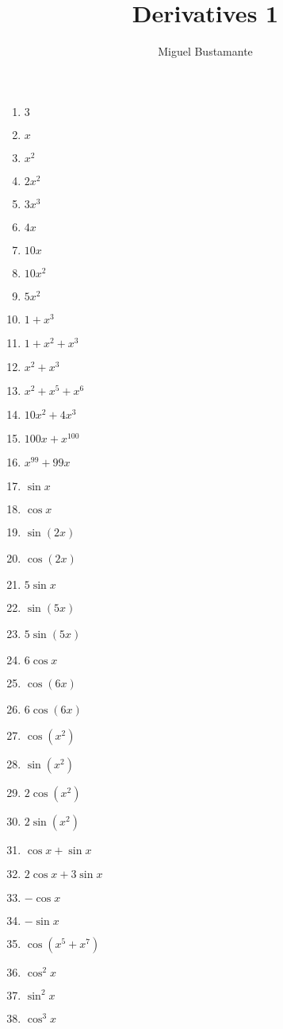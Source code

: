 \documentclass{article}
\title{Derivatives 1}
\author{Miguel Bustamante}
\begin{document}
\maketitle
\begin{multicols}{3} %
\begin{enumerate}
    \item $3$
    \item $x$
    \item $x^2$
    \item $2x^2$
    \item $3x^3$
    \item $4x$
    \item $10x$
    \item $10x^2$
    \item $5x^2$
    \item $1+x^3$
    \item $1+x^2+x^3$
    \item $x^2+x^3$
    \item $x^2+x^5+x^6$
    \item $10x^2+4x^3$
    \item $100x+x^{100}$
    \item $x^{99}+99x$
    \item $\sin x$
    \item $\cos x$
    \item $\sin(2x)$
    \item $\cos(2x)$
    \item $5\sin x$
    \item $\sin(5x)$
    \item $5\sin(5x)$
    \item $6\cos x$
    \item $\cos(6x)$
    \item $6\cos(6x)$
    \item $\cos(x^2)$
    \item $\sin(x^2)$
    \item $2\cos(x^2)$
    \item $2\sin(x^2)$
    \item $\cos x+\sin x$
    \item $2\cos x+3\sin x$
    \item $-\cos x$
    \item $-\sin x$
    \item $\cos(x^5+x^7)$
    \item $\cos^2 x$
    \item $\sin^2 x$
    \item $\cos^3 x$

\end{enumerate}
\end{multicols}
\end{document}
